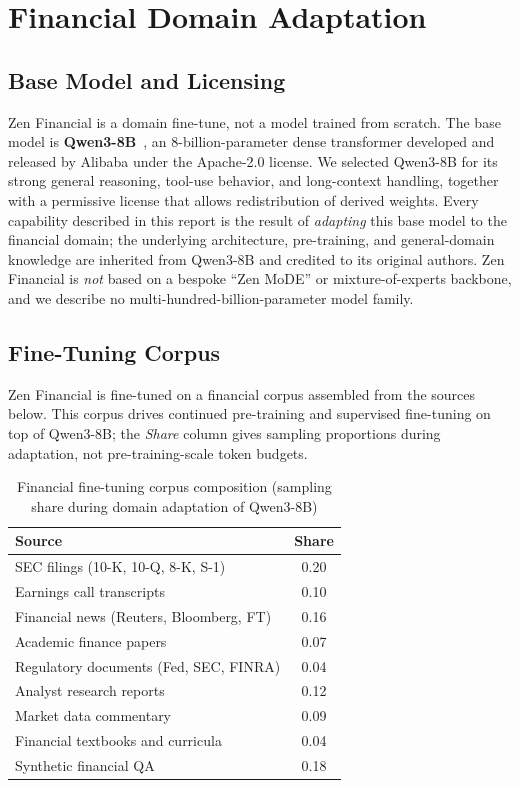 \documentclass[11pt,a4paper]{article}
\begin{document}
\section{Financial Domain Adaptation}

\subsection{Base Model and Licensing}

Zen Financial is a domain fine-tune, not a model trained from scratch. The base model is \textbf{Qwen3-8B}~\cite{qwen3}, an 8-billion-parameter dense transformer developed and released by Alibaba under the Apache-2.0 license. We selected Qwen3-8B for its strong general reasoning, tool-use behavior, and long-context handling, together with a permissive license that allows redistribution of derived weights. Every capability described in this report is the result of \emph{adapting} this base model to the financial domain; the underlying architecture, pre-training, and general-domain knowledge are inherited from Qwen3-8B and credited to its original authors. Zen Financial is \emph{not} based on a bespoke ``Zen MoDE'' or mixture-of-experts backbone, and we describe no multi-hundred-billion-parameter model family.

\subsection{Fine-Tuning Corpus}

Zen Financial is fine-tuned on a financial corpus assembled from the sources below. This corpus drives continued pre-training and supervised fine-tuning on top of Qwen3-8B; the \emph{Share} column gives sampling proportions during adaptation, not pre-training-scale token budgets.

\begin{table}[H]
\centering
\caption{Financial fine-tuning corpus composition (sampling share during domain adaptation of Qwen3-8B)}
\label{tab:corpus}
\begin{tabular}{lc}
\toprule
Source & Share \\
\midrule
SEC filings (10-K, 10-Q, 8-K, S-1) & 0.20 \\
Earnings call transcripts & 0.10 \\
Financial news (Reuters, Bloomberg, FT) & 0.16 \\
Academic finance papers & 0.07 \\
Regulatory documents (Fed, SEC, FINRA) & 0.04 \\
Analyst research reports & 0.12 \\
Market data commentary & 0.09 \\
Financial textbooks and curricula & 0.04 \\
Synthetic financial QA & 0.18 \\
\bottomrule
\end{tabular}
\end{table}
\end{document}
